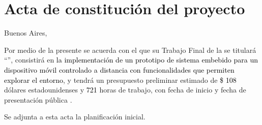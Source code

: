 \documentclass[
11pt, %
]{charter}
\begin{document}
\section*{Acta de constitución del proyecto}
\label{sec:acta}

\begin{flushright}
Buenos Aires, \fechaInicioName
\end{flushright}

\vspace{2cm}

Por medio de la presente se acuerda con el \authorname\hspace{1px} que su Trabajo Final de la \degreename\hspace{1px} se titulará ``\ttitle'', consistirá en \textcolor{black}{la implementación de un prototipo de sistema embebido para un dispositivo móvil controlado a distancia con funcionalidades que permiten explorar el entorno}, y tendrá un presupuesto preliminar estimado de \textcolor{black}{\$ 108} dólares estadounidenses y \textcolor{black}{721} horas de trabajo, con fecha de inicio \fechaInicioName\hspace{1px} y fecha de presentación pública \fechaFinalName.

Se adjunta a esta acta la planificación inicial.

\vfill
\end{document}
